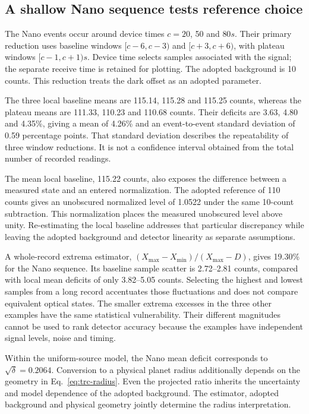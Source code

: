 \subsection{A shallow Nano sequence tests reference choice}
The Nano events occur around device times $c=20$, 50 and $80\unit{s}$. Their primary reduction uses baseline windows $[c-6,c-3)$ and $[c+3,c+6)$, with plateau windows $[c-1,c+1)\unit{s}$. Device time selects samples associated with the signal; the separate receive time is retained for plotting. The adopted background is 10 counts. This reduction treats the dark offset as an adopted parameter.

The three local baseline means are 115.14, 115.28 and 115.25 counts, whereas the plateau means are 111.33, 110.23 and 110.68 counts. Their deficits are 3.63, 4.80 and 4.35\%, giving a mean of 4.26\% and an event-to-event standard deviation of 0.59 percentage points. That standard deviation describes the repeatability of three window reductions. It is not a confidence interval obtained from the total number of recorded readings.

The mean local baseline, 115.22 counts, also exposes the difference between a measured state and an entered normalization. The adopted reference of 110 counts gives an unobscured normalized level of 1.0522 under the same 10-count subtraction. This normalization places the measured unobscured level above unity. Re-estimating the local baseline addresses that particular discrepancy while leaving the adopted background and detector linearity as separate assumptions.

A whole-record extrema estimator, $(X_{\max}-X_{\min})/(X_{\max}-D)$, gives 19.30\% for the Nano sequence. Its baseline sample scatter is 2.72--2.81 counts, compared with local mean deficits of only 3.82--5.05 counts. Selecting the highest and lowest samples from a long record accentuates those fluctuations and does not compare equivalent optical states. The smaller extrema excesses in the three other examples have the same statistical vulnerability. Their different magnitudes cannot be used to rank detector accuracy because the examples have independent signal levels, noise and timing.

Within the uniform-source model, the Nano mean deficit corresponds to $\sqrt{\delta}=0.2064$. Conversion to a physical planet radius additionally depends on the geometry in Eq.~\ref{eq:trc-radius}. Even the projected ratio inherits the uncertainty and model dependence of the adopted background. The estimator, adopted background and physical geometry jointly determine the radius interpretation.

